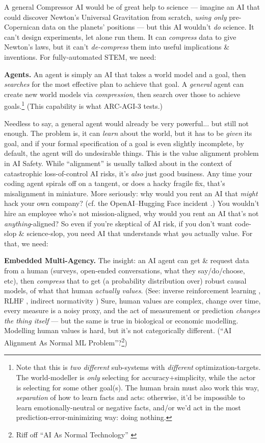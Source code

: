 \documentclass[11pt]{article}
\begin{document}
A general Compressor AI would be of great help to science — imagine an AI that could discover Newton's Universal Gravitation from scratch, \textit{using only} pre-Copernican data on the planets' positions — but this AI wouldn't \textit{do} science. It can't design experiments, let alone run them. It can \textit{compress} data to give Newton's laws, but it can't \textit{de-compress} them into useful implications \& inventions. For fully-automated STEM, we need:

\textbf{Agents.} An agent is simply an AI that takes a world model and a goal, then \textit{searches} for the most effective plan to achieve that goal. A \textit{general} agent can create new world models via \textit{compression}, then search over those to achieve goals.\footnote{Note that this is \textit{two different} sub-systems with \textit{different} optimization-targets. The world-modeller is \textit{only} selecting for accuracy+simplicity, while the actor is selecting for some other goal(s). The human brain must also work this way, \textit{separation} of how to learn facts and acts: otherwise, it'd be impossible to learn emotionally-neutral or negative facts, and/or we'd act in the most prediction-error-minimizing way: doing nothing.} (This capability is what ARC-AGI-3 tests.)

Needless to say, a general agent would already be very powerful... but still not enough. The problem is, it can \textit{learn} about the world, but it has to be \textit{given} its goal, and if your formal specification of a goal is even slightly incomplete, by default, the agent will do undesirable things. This is the value alignment problem in AI Safety. \citep{human_compatible} While ``alignment'' is usually talked about in the context of catastrophic loss-of-control AI risks, it's \textit{also} just good business. Any time your coding agent spirals off on a tangent, or does a hacky fragile fix, that's misalignment in miniature. More seriously: why would you rent an AI that \textit{might} hack your own company? (cf. the OpenAI–Hugging Face incident \citep{metr_hf_investigation}.) You wouldn't hire an employee who's not mission-aligned, why would you rent an AI that's not \textit{anything}-aligned? So even if you're skeptical of AI risk, if you don't want code-slop \& science-slop, you need AI that understands what \textit{you} actually value. For that, we need:

\textbf{Embedded Multi-Agency.} The insight: an AI agent can get \& request data from a human (surveys, open-ended conversations, what they say/do/choose, etc), then \textit{compress} that to get (a probability distribution over) robust causal models, of what that human \textit{actually values}. (See: inverse reinforcement learning \citep{inverse_rl}, RLHF \citep{rlhf}, indirect normativity \citep{superintelligence}) Sure, human values are complex, change over time, every measure is a noisy proxy, and the act of measurement or prediction \textit{changes the thing itself} — but the same is true in biological or economic modelling. Modelling human values is hard, but it's not categorically different. (``AI Alignment As Normal ML Problem''?\footnote{Riff off ``AI As Normal Technology'' \citep{ai_normal_technology}})
\end{document}
